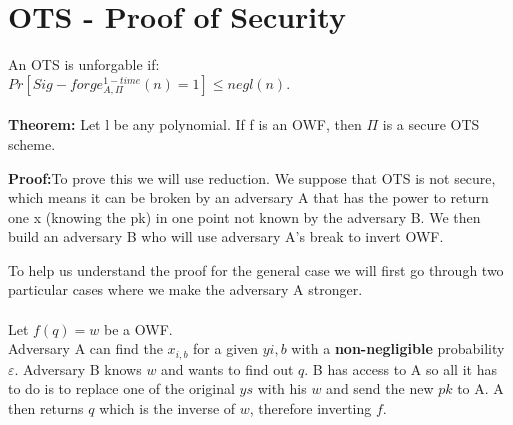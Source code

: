 \documentclass[oneside,a4paper,12pt]{book}
\begin{document}
\section{OTS - Proof of Security}

An OTS is unforgable if:\\
$Pr[Sig-forge^{1-time}_{A,\Pi}(n) = 1] \leq negl(n).$\\\\

\textbf{Theorem:} Let l be any polynomial. If f is an OWF, then $\Pi$ is a secure OTS scheme.

\textbf{Proof:}To prove this we will use reduction. We suppose that OTS is not secure, which means it can be broken by an adversary A that has the power to return one x (knowing the pk) in one point not known by the adversary B. We then build an adversary B who will use adversary A's break to invert OWF.

To help us understand the proof for the general case we will first go through two particular cases where we make the adversary A stronger.\\\\

Let $f(q)=w$ be a OWF.\\
Adversary A can find the $x_{i,b}$ for a given $y{i,b}$ with a \textbf{non-negligible} probability $\varepsilon$.
Adversary B knows $w$ and wants to find out $q$. B has access to A so all it has to do is to replace one of the original $ys$ with his $w$ and send the new $pk$ to A. A then returns $q$ which is the inverse of $w$, therefore inverting $f$.\\
\end{document}
